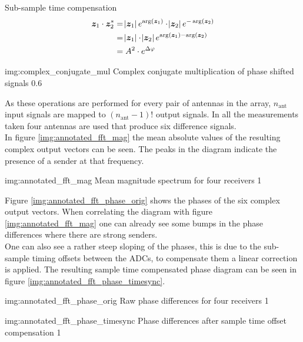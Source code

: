 \begin{subchapter}{Sub-sample time compensation}
  \begin{equation}
    \label{eq:multiply_cplx_conj}
    \begin{split}
      \bm{z}_\text{1} \cdot \bm{z}_\text{2}^{\ast}
      & = \abs{\bm{z}_\text{1}} e^{\arg(\bm{z}_\text{1})}
        \cdot
        \abs{\bm{z}_\text{2}} e^{-\arg(\bm{z}_\text{2})} \\
      & = \abs{\bm{z}_\text{1}} \cdot \abs{\bm{z}_\text{2}}
        e^{\arg(\bm{z}_\text{1}) - \arg(\bm{z}_\text{2})} \\
      & = A^{2} \cdot e^{\Delta \varphi}
    \end{split}
  \end{equation}

               {img:complex_conjugate_mul}
               {Complex conjugate multiplication of phase shifted signals}
               {0.6}

  As these operations are performed for every pair
  of antennas in the array, $n_\text{ant}$ input
  signals are mapped to $\left(n_\text{ant}-1\right)!$
  output signals.
  In all the measurements taken four antennas are used
  that produce six difference signals. \\

  In figure \ref{img:annotated_fft_mag} the mean
  absolute values of the resulting complex output
  vectors can be seen. The peaks in the diagram indicate
  the presence of a sender at that frequency.

               {img:annotated_fft_mag}
               {Mean magnitude spectrum for four receivers}
               {1}

  Figure \ref{img:annotated_fft_phase_orig} shows the phases
  of the six complex output vectors. When correlating the
  diagram with figure \ref{img:annotated_fft_mag} one can already
  see some bumps in the phase differences where there are strong senders. \\

  One can also see a rather steep sloping of the phases,
  this is due to the sub-sample timing offsets between the
  ADCs, to compensate them a linear correction is applied.
  The resulting sample time compensated phase diagram can be seen in
  figure \ref{img:annotated_fft_phase_timesync}.

               {img:annotated_fft_phase_orig}
               {Raw phase differences for four receivers}
               {1}

               {img:annotated_fft_phase_timesync}
               {Phase differences after sample time offset compensation}
               {1}
\end{subchapter}

